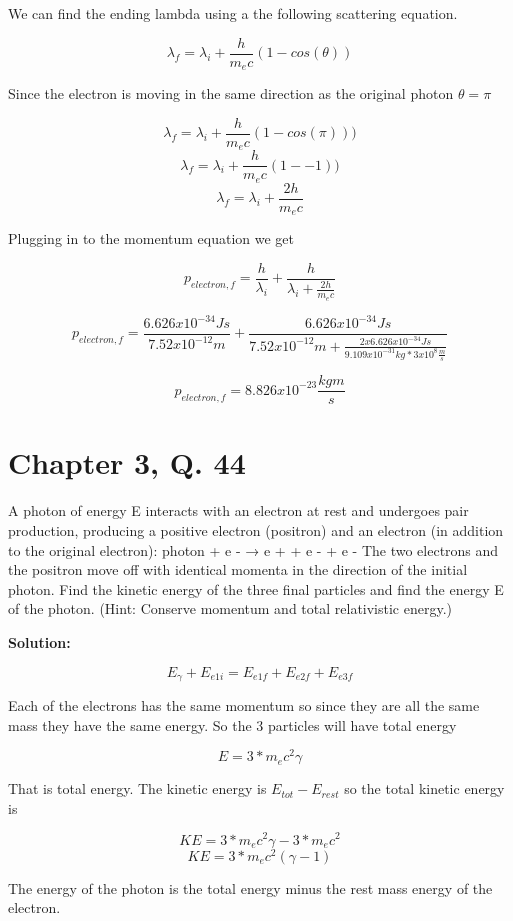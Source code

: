 \documentclass{article}
\begin{document}
We can find the ending lambda using a the following scattering equation.

$$ \lambda_f = \lambda_i + \frac{h}{m_ec}(1 - cos(\theta)) $$

Since the electron is moving in the same direction as the original photon $\theta = \pi$

$$ \lambda_f = \lambda_i + \frac{h}{m_ec}(1 - cos(\pi))) $$
$$ \lambda_f = \lambda_i + \frac{h}{m_ec}(1 - -1)) $$
$$ \lambda_f = \lambda_i + \frac{2h}{m_ec} $$


Plugging in to the momentum equation we get

$$ p_{electron,f} = \frac{h}{\lambda_i} + \frac{h}{\lambda_i + \frac{2h}{m_ec} } $$

$$ p_{electron,f} = \frac{6.626 x 10^{-34}Js}{7.52x10^{-12}m} + \frac{6.626 x 10^{-34}Js}{7.52x10^{-12}m + \frac{2x6.626 x 10^{-34}Js}{9.109x10^{-31}kg * 3x10^8\frac{m}{s}}} $$

$$ p_{electron,f} = 8.826 x 10^{-23} \frac{kg m}{s}  $$


\section*{Chapter 3, Q. 44}

A photon of energy E interacts with an electron at rest and undergoes pair production, producing a positive electron (positron) and an electron (in addition to the original electron): photon + e - → e + + e - + e - The two electrons and the positron move off with identical momenta in the direction of the initial photon. Find the kinetic energy of the three final particles and find the energy E of the photon. (Hint: Conserve momentum and total relativistic energy.)

\textbf{Solution:}

$$ E_\gamma + E_{e1i} = E_{e1f} + E_{e2f} + E_{e3f} $$

Each of the electrons has the same momentum so since they are all the same mass they have the same energy. So the 3 particles will have total energy

$$ E = 3 * m_ec^2\gamma $$

That is total energy. The kinetic energy is $ E_{tot} - E_{rest} $ so the total kinetic energy is

$$ KE = 3 * m_ec^2\gamma - 3 * m_ec^2 $$
$$ KE = 3 * m_ec^2(\gamma - 1) $$

The energy of the photon is the total energy minus the rest mass energy of the electron.
\end{document}
